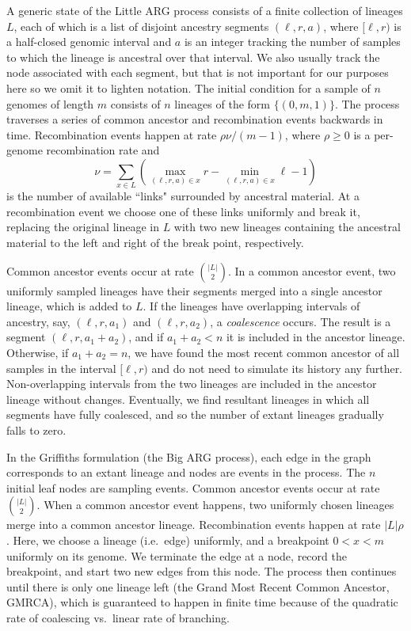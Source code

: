 \documentclass{article}
\begin{document}
A generic state of the Little ARG process consists of a finite collection of lineages $L$,
each of which is a list of disjoint ancestry segments $(\ell, r, a)$, where
$[\ell, r)$ is a half-closed genomic interval and $a$ is an integer
tracking the number of samples to which the lineage is ancestral over that interval.
We also usually track the node associated with each segment, but
that is not important for our purposes here so we omit it to lighten notation.
The initial condition for a sample of $n$ genomes of length $m$ consists of $n$ lineages
of the form $\{(0, m, 1)\}$. The process traverses a series of common ancestor and
recombination events backwards in time.
Recombination events happen at rate $\rho \nu / (m - 1)$,
where $\rho \geq 0$ is a per-genome recombination rate and
 \[
 \nu = \sum_{x \in L}\left( \max_{(\ell, r, a) \in x}r
     - \min_{(\ell, r, a) \in x}\ell - 1 \right)
 \]
 is the number of available ``links" surrounded by ancestral material.
 At a recombination event we choose one of these links uniformly and break it,
 replacing the original lineage in $L$ with two new lineages containing the ancestral material
 to the left and right of the break point, respectively.

Common ancestor events occur at rate $\binom{|L|}{2}$.
In a common ancestor event, two uniformly sampled lineages have their segments
merged into a single ancestor lineage, which is added to $L$.
If the lineages have overlapping intervals of ancestry,
say, $(\ell, r, a_1)$ and $(\ell, r, a_2)$, a
\emph{coalescence} occurs. The result is a segment
$(\ell, r, a_1 + a_2)$, and if $a_1 + a_2 < n$ it is included in the
ancestor lineage. Otherwise, if $a_1 + a_2 = n$, we have found
the most recent common ancestor of all samples in the interval $[\ell, r)$
and do not need to simulate its history any further.
Non-overlapping intervals from the two lineages are included
 in the ancestor lineage without changes. Eventually,
we find resultant lineages in which all segments have fully coalesced,
and so the number of extant lineages gradually falls to zero.

In the Griffiths formulation (the Big ARG process), each edge in the graph corresponds to an extant
lineage and nodes are events in the process. The $n$ initial leaf nodes are
sampling events. Common ancestor events occur at rate $\binom{|L|}{2}$.
When a common ancestor event happens, two uniformly chosen lineages
merge into a common ancestor lineage.
Recombination events happen at rate $|L| \rho$. Here, we choose a lineage (i.e.\ edge) uniformly,
and a breakpoint $0 < x < m$ uniformly on its genome. We terminate the edge at a
node, record the breakpoint, and start two new edges from this node. The process
then continues until there is only one lineage left (the Grand Most Recent
Common Ancestor, GMRCA), which is guaranteed to
happen in finite time because of the quadratic rate of coalescing vs.\ linear rate of branching.
\end{document}
